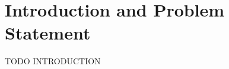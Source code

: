 \chapter{Introduction and Problem Statement}
\label{chp:introduction}
TODO INTRODUCTION

\vspace{1\baselineskip}

\noindent


